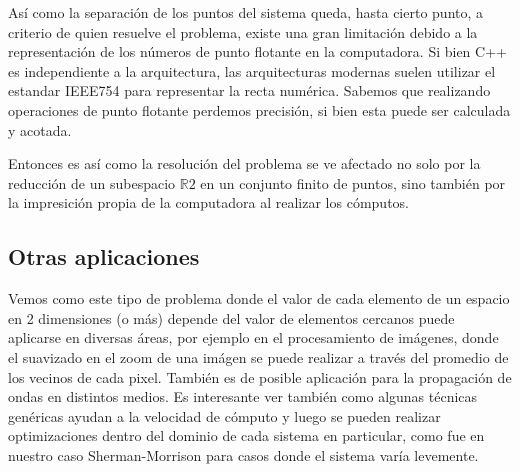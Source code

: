 As\'i como la separaci\'on de los puntos del sistema queda, hasta cierto punto, a criterio de quien resuelve el problema, existe una gran limitaci\'on debido	a la representaci\'on de los n\'umeros de punto flotante en la computadora. Si bien C++ es independiente a la arquitectura, las arquitecturas modernas suelen utilizar el estandar IEEE754 para representar la recta num\'erica. Sabemos que realizando operaciones de punto flotante perdemos precisi\'on, si bien esta puede ser calculada y acotada. 

Entonces es as\'i como la resoluci\'on del problema se ve afectado no solo por la reducci\'on de un subespacio $\mathbb{R}2$ en un conjunto finito de puntos, sino tambi\'en por la impresici\'on propia de la computadora al realizar los c\'omputos.

\subsection{Otras aplicaciones}

Vemos como este tipo de problema donde el valor de cada elemento de un espacio en 2 dimensiones (o m\'as) depende del valor de elementos cercanos puede aplicarse en diversas \'areas, por ejemplo en el procesamiento de im\'agenes, donde el suavizado en el zoom de una im\'agen se puede realizar a trav\'es del promedio de los vecinos de cada pixel. Tambi\'en es de posible aplicaci\'on para la propagaci\'on de ondas en distintos medios. Es interesante ver tambi\'en como algunas t\'ecnicas gen\'ericas ayudan a la velocidad de c\'omputo y luego se pueden realizar optimizaciones dentro del dominio de cada sistema en particular, como fue en nuestro caso Sherman-Morrison para casos donde el sistema var\'ia levemente.
